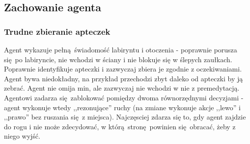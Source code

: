 \begin{figure}[H]
\end{figure}

\begin{figure}[H]
\end{figure}

\begin{figure}[H]
\end{figure}

\subsection{Zachowanie agenta}
\subsubsection{Trudne zbieranie apteczek}
Agent wykazuje pełną świadomość labiryntu i otoczenia - poprawnie porusza się po labiryncie, nie wchodzi w ściany i nie blokuje się w ślepych zaułkach. Poprawnie identyfikuje apteczki i zazwyczaj zbiera je zgodnie z oczekiwaniami. Agent bywa niedokładny, na przykład przechodzi zbyt daleko od apteczki by ją zebrać. Agent nie omija min, ale zazwyczaj nie wchodzi w nie z premedytacją. Agentowi zadarza się zablokować pomiędzy dwoma równorzędnymi decyzjami - agent wykonuje wtedy ,,rezonujące'' ruchy (na zmiane wykonuje akcje ,,lewo'' i ,,prawo'' bez ruszania się z miejsca). Najczęsciej zdarza się to, gdy agent zajdzie do rogu i nie może zdecydować, w którą stronę powinien się obracać, żeby z niego wyjść.

